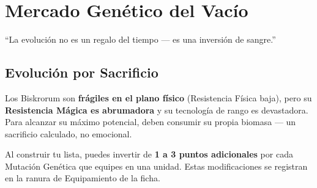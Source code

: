 
\chapter{Mercado Genético del Vacío}

\begin{loreblock}
``La evolución no es un regalo del tiempo — es una inversión de sangre.''
\end{loreblock}

\section*{Evolución por Sacrificio}

Los Biskrorum son \textbf{frágiles en el plano físico} (Resistencia Física baja), pero su \textbf{Resistencia Mágica es abrumadora} y su tecnología de rango es devastadora. Para alcanzar su máximo potencial, deben consumir su propia biomasa — un sacrificio calculado, no emocional.

Al construir tu lista, puedes invertir de \textbf{1 a 3 puntos adicionales} por cada Mutación Genética que equipes en una unidad. Estas modificaciones se registran en la ranura de Equipamiento de la ficha.

\vspace{0.4cm}

